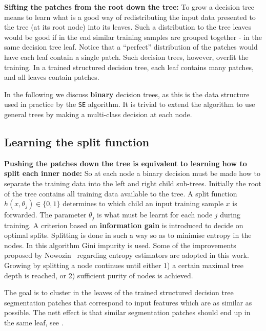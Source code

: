 \textbf{Sifting the patches from the root down the tree:} To grow a decision tree means to learn what is a good way of redistributing the input data presented to the tree (at its root node) into its leaves. Such a distribution to the tree leaves would be good if in the end similar training samples are grouped together - in the same decision tree leaf. Notice that a ``perfect'' distribution of the patches would have each leaf contain a single patch. Such decision trees, however, overfit the training. In a trained structured decision tree, each leaf contains many patches, and all leaves contain patches.

In the following we discuss {\bf binary} decision trees, as this is the data structure used in practice by the {\tt SE} algorithm. It is trivial to extend the algorithm to use general trees by making a multi-class decision at each node. 

\subsection{Learning the split function}
\textbf{Pushing the patches down the tree is equivalent to learning how to split each inner node:} So at each node a binary decision must be made how to separate the training data into the left and right child sub-trees. Initially the root of the tree contains all training data available to the tree. A split function $h(x,\theta_j)\in\{0,1\}$ determines to which child an input training sample $x$ is forwarded. The parameter $\theta_j$ is what must be learnt for each node $j$ during training. A criterion based on {\bf information gain} is introduced to decide on optimal %
splits. Splitting is done in such a way so as to minimise entropy in the nodes. In this algorithm Gini impurity is used. Some of the improvements proposed by Nowozin~\cite{Nowozin12improvedinformation,nowozin2014decision} regarding entropy estimators are adopted in this work. Growing by splitting a node continues until either 1) a certain maximal tree depth is reached, or 2) sufficient purity of nodes is achieved.

The goal is to cluster in the leaves of the trained structured decision tree segmentation patches that correspond to input features which are as similar as possible. The nett effect is that similar segmentation patches should end up in the same leaf, see .

